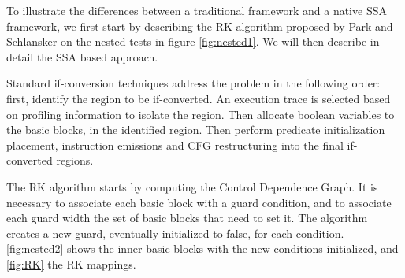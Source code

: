 To illustrate the differences between a traditional framework and a native SSA framework, we first start by describing the RK algorithm proposed by Park and Schlansker on the nested tests in figure \ref{fig:nested1}. We will then describe in detail the SSA based approach.

Standard if-conversion techniques address the problem in the following order: first, identify the region to be if-converted. An execution trace is selected based on profiling information to isolate the region. Then allocate boolean variables to the basic blocks, in the identified region. Then perform predicate initialization placement, instruction emissions and CFG restructuring into the final if-converted regions.

The RK algorithm starts by computing the Control Dependence Graph. It is necessary to associate each basic block with a guard condition, and to associate each guard width the set of basic blocks that need to set it. The algorithm creates a new guard, eventually initialized to false, for each condition. \ref{fig:nested2} shows the inner basic blocks with the new conditions initialized, and \ref{fig:RK} the RK mappings.

